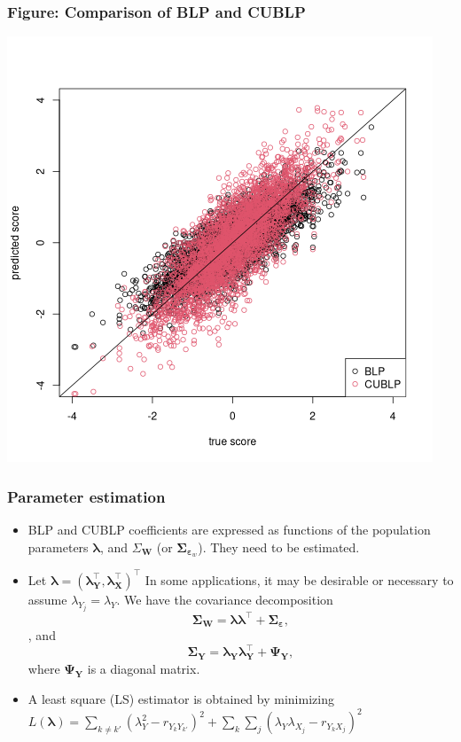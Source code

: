 \documentclass{beamer}
\newcommand{\mbf}[1]{\bm{#1}}
\newcommand{\bX}{\mbf{X}}
\newcommand{\bY}{\mbf{Y}}
\newcommand{\beps}{\mbf{\varepsilon}}
\newcommand{\blambda}{\mbf{\lambda}}
\newcommand{\bW}{\mbf{W}}
\begin{document}
	\begin{frame}[t]\frametitle{Figure: Comparison of BLP and CUBLP}
	\centering
		\includegraphics[scale = 0.4]{Fig/prediction.png}
	\end{frame}

	\begin{frame}[t]\frametitle{Parameter estimation}
	\begin{itemize}
		\item BLP and CUBLP coefficients are expressed as functions of the population
		parameters $\blambda$, and $\Sigma_{\bW}$ (or $\mbf{\Sigma}_{\beps_w}$).
		They need to be estimated.
		\item Let $\blambda = \left (\blambda_{\bY}^\top, \blambda_{\bX}^\top
		\right)^\top$ In some applications, it may be desirable or necessary to
		assume $\lambda_{Y_j} = \lambda_{Y}$. We have the covariance decomposition
		\begin{equation}
	  	\mbf{\Sigma}_{\bW} = \blambda \blambda^\top + \mbf{\Sigma}_{\beps},
	  \end{equation},
	  and \begin{equation}
    			\mbf{\Sigma}_{\bY} = \blambda_{\bY} \blambda_{\bY}^\top + \mbf{\Psi}_
    			{\bY},
  			\end{equation}
  	where $\mbf{\Psi}_{\bY}$ is a diagonal matrix.
  	\item A least square (LS) estimator is obtained by minimizing $L(\blambda) =
  	\sum_{k \neq k'} (\lambda_{Y}^2 - r_{Y_k Y_{k'}})^2 + \sum_k \sum_j 
  	(\lambda_Y \lambda_{X_j} - r_{Y_k X_j})^2$
	\end{itemize}
	\end{frame}
\end{document}
